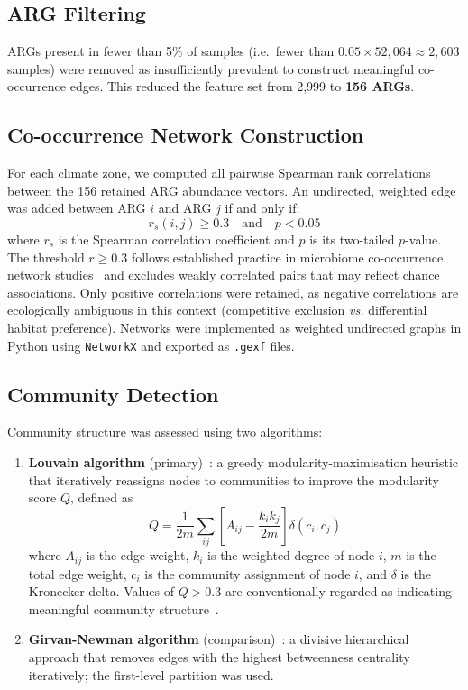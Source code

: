 \documentclass[12pt,a4paper]{article}
\begin{document}
\subsection{ARG Filtering}\label{sec:filter}

ARGs present in fewer than 5\% of samples (i.e.\ fewer than
$0.05 \times 52{,}064 \approx 2{,}603$ samples) were removed as
insufficiently prevalent to construct meaningful co-occurrence edges.
This reduced the feature set from 2,999 to \textbf{156 ARGs}.

\subsection{Co-occurrence Network Construction}\label{sec:network}

For each climate zone, we computed all pairwise Spearman rank
correlations between the 156 retained ARG abundance vectors.
An undirected, weighted edge was added between ARG $i$ and ARG $j$
if and only if:
\begin{equation}
  r_s(i, j) \geq 0.3 \quad \text{and} \quad p < 0.05
  \label{eq:edge}
\end{equation}
where $r_s$ is the Spearman correlation coefficient and $p$ is its
two-tailed $p$-value.
The threshold $r \geq 0.3$ follows established practice in
microbiome co-occurrence network studies~\cite{Faust2012} and
excludes weakly correlated pairs that may reflect chance associations.
Only positive correlations were retained, as negative correlations
are ecologically ambiguous in this context (competitive exclusion
\emph{vs.} differential habitat preference).
Networks were implemented as weighted undirected graphs in Python
using \texttt{NetworkX} and exported as \texttt{.gexf} files.

\subsection{Community Detection}\label{sec:community}

Community structure was assessed using two algorithms:
\begin{enumerate}
  \item \textbf{Louvain algorithm} (primary)~\cite{Blondel2008}:
    a greedy modularity-maximisation heuristic that iteratively
    reassigns nodes to communities to improve the modularity score
    $Q$, defined as
    \begin{equation}
      Q = \frac{1}{2m} \sum_{ij}
          \left[ A_{ij} - \frac{k_i k_j}{2m} \right]
          \delta(c_i, c_j)
      \label{eq:modularity}
    \end{equation}
    where $A_{ij}$ is the edge weight, $k_i$ is the weighted degree
    of node $i$, $m$ is the total edge weight, $c_i$ is the community
    assignment of node $i$, and $\delta$ is the Kronecker delta.
    Values of $Q > 0.3$ are conventionally regarded as indicating
    meaningful community structure~\cite{Newman2006}.
  \item \textbf{Girvan-Newman algorithm} (comparison)~\cite{Girvan2002}:
    a divisive hierarchical approach that removes edges with the
    highest betweenness centrality iteratively; the first-level
    partition was used.
\end{enumerate}
\end{document}

